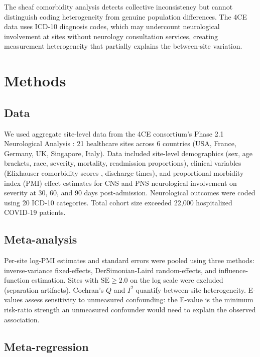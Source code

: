 \documentclass{article}
\begin{document}
The sheaf comorbidity analysis detects collective inconsistency but cannot distinguish coding heterogeneity from genuine population differences.
The 4CE data uses ICD-10 diagnosis codes, which may undercount neurological involvement at sites without neurology consultation services, creating measurement heterogeneity that partially explains the between-site variation.


\section{Methods}

\subsection{Data}

We used aggregate site-level data from the 4CE consortium's Phase 2.1 Neurological Analysis \cite{four_ce_neuro2021, chou20224ce}: 21 healthcare sites across 6 countries (USA, France, Germany, UK, Singapore, Italy).
Data included site-level demographics (sex, age brackets, race, severity, mortality, readmission proportions), clinical variables (Elixhauser comorbidity scores \cite{elixhauser1998}, discharge times), and proportional morbidity index (PMI) effect estimates for CNS and PNS neurological involvement on severity at 30, 60, and 90 days post-admission.
Neurological outcomes were coded using 20 ICD-10 categories.
Total cohort size exceeded 22,000 hospitalized COVID-19 patients.

\subsection{Meta-analysis}

Per-site log-PMI estimates and standard errors were pooled using three methods: inverse-variance fixed-effects, DerSimonian-Laird random-effects, and influence-function estimation.
Sites with $\text{SE} \geq 2.0$ on the log scale were excluded (separation artifacts).
Cochran's $Q$ and $I^2$ quantify between-site heterogeneity.
E-values \cite{vanderweele2017} assess sensitivity to unmeasured confounding: the E-value is the minimum risk-ratio strength an unmeasured confounder would need to explain the observed association.

\subsection{Meta-regression}
\end{document}
